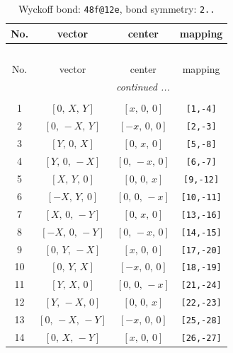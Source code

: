 \documentclass[fleqn,8pt]{jsarticle}
\begin{document}
\begin{longtable}{cccc}
\caption{Wyckoff bond: {\tt 48f@12e}, bond symmetry: {\tt 2..}}
 \\
 \hline \hline
No. & vector & center & mapping \\ \hline \endfirsthead

\multicolumn{3}{l}{\tablename\ \thetable{}} \\
 \hline \hline
No. & vector & center & mapping \\ \hline \endhead

 \hline \hline
\multicolumn{3}{r}{\footnotesize\it continued ...} \\ \endfoot

 \hline \hline
\multicolumn{3}{r}{} \\ \endlastfoot

1 & $\left[ 0,\, X,\, Y \right]$ & $\left[ x,\, 0,\, 0 \right]$ & {\tt [1,-4]} \\ \hline
2 & $\left[ 0,\, - X,\, Y \right]$ & $\left[ - x,\, 0,\, 0 \right]$ & {\tt [2,-3]} \\ \hline
3 & $\left[ Y,\, 0,\, X \right]$ & $\left[ 0,\, x,\, 0 \right]$ & {\tt [5,-8]} \\ \hline
4 & $\left[ Y,\, 0,\, - X \right]$ & $\left[ 0,\, - x,\, 0 \right]$ & {\tt [6,-7]} \\ \hline
5 & $\left[ X,\, Y,\, 0 \right]$ & $\left[ 0,\, 0,\, x \right]$ & {\tt [9,-12]} \\ \hline
6 & $\left[ - X,\, Y,\, 0 \right]$ & $\left[ 0,\, 0,\, - x \right]$ & {\tt [10,-11]} \\ \hline
7 & $\left[ X,\, 0,\, - Y \right]$ & $\left[ 0,\, x,\, 0 \right]$ & {\tt [13,-16]} \\ \hline
8 & $\left[ - X,\, 0,\, - Y \right]$ & $\left[ 0,\, - x,\, 0 \right]$ & {\tt [14,-15]} \\ \hline
9 & $\left[ 0,\, Y,\, - X \right]$ & $\left[ x,\, 0,\, 0 \right]$ & {\tt [17,-20]} \\ \hline
10 & $\left[ 0,\, Y,\, X \right]$ & $\left[ - x,\, 0,\, 0 \right]$ & {\tt [18,-19]} \\ \hline
11 & $\left[ Y,\, X,\, 0 \right]$ & $\left[ 0,\, 0,\, - x \right]$ & {\tt [21,-24]} \\ \hline
12 & $\left[ Y,\, - X,\, 0 \right]$ & $\left[ 0,\, 0,\, x \right]$ & {\tt [22,-23]} \\ \hline
13 & $\left[ 0,\, - X,\, - Y \right]$ & $\left[ - x,\, 0,\, 0 \right]$ & {\tt [25,-28]} \\ \hline
14 & $\left[ 0,\, X,\, - Y \right]$ & $\left[ x,\, 0,\, 0 \right]$ & {\tt [26,-27]} \\ \hline

\end{longtable}
\end{document}
